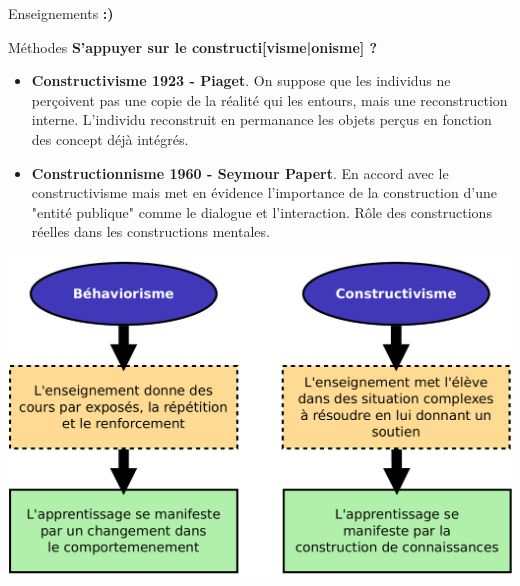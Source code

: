 \begin{frame}{Enseignements}
\Huge \textbf{:)}
\end{frame}

\begin{frame}{Méthodes}
\textbf{\Huge  S'appuyer sur le constructi[visme|onisme] ?}
\begin{itemize}
  \item \textbf{Constructivisme 1923 - Piaget}. On suppose que les individus ne perçoivent pas une copie de la réalité qui les entours, mais une reconstruction interne. L'individu reconstruit en permanance les objets perçus en fonction des concept déjà intégrés.
  \item \textbf{Constructionnisme 1960 - Seymour Papert}. En accord avec le constructivisme mais met en évidence l'importance de la construction d'une "entité publique" comme le dialogue et l'interaction. Rôle des constructions réelles dans les constructions mentales.
\end{itemize}
\end{frame}

\begin{frame}
  \begin{center}  
\includegraphics[width=.8\textwidth]
  {../resources/illustrations/behaviorisme_constructivisme}
    \end{center}
\end{frame}

